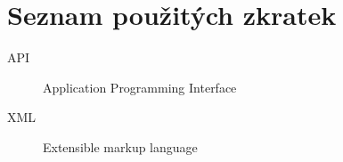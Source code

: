 \chapter{Seznam použitých zkratek}

\begin{description}
	\item[API] Application Programming Interface
	\item[XML] Extensible markup language
\end{description}